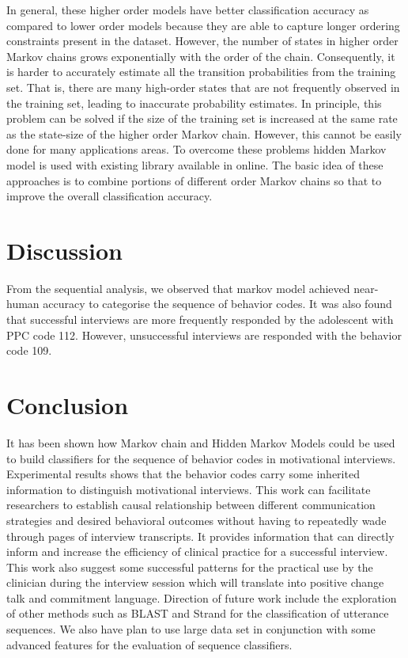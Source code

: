 \documentclass{amia}
\begin{document}
In general, these higher order models have better classification accuracy as compared to lower order models because they are able to capture longer ordering constraints present in the dataset. However, the number of states in higher order Markov chains grows exponentially with the order of the chain. Consequently, it is harder to accurately estimate all the transition probabilities from the training set. That is, there are many high-order states that are not frequently observed in the training set, leading to inaccurate probability estimates. In principle, this problem can be solved if the size of the training set is increased at the same rate as the state-size of the higher order Markov chain. However, this cannot be easily done for many applications areas. To overcome these problems hidden Markov model is used with existing library available in online. The basic idea of these approaches is to combine portions of different order Markov chains so that to improve the overall classification accuracy.

\section*{Discussion}
From the sequential analysis, we observed that markov model achieved near-human accuracy to categorise the sequence of behavior codes. It was also found that successful interviews are more frequently responded by the adolescent with PPC code 112. However, unsuccessful interviews are responded with the behavior code 109.

\section*{Conclusion}
It has been shown how Markov chain and Hidden Markov Models could be used to build classifiers for the sequence of behavior codes in motivational interviews. Experimental results shows that the behavior codes carry some inherited information to distinguish motivational interviews. This work can facilitate researchers to establish causal relationship between different communication strategies and desired behavioral outcomes without having to repeatedly wade through pages of interview transcripts. It provides information that can directly inform and increase the efficiency of clinical practice for a successful interview. This work also suggest some successful patterns for the practical use by the clinician during the interview session which will translate into positive change talk and commitment language. Direction of future work include the exploration of other methods such as BLAST \cite{altschul1990basic} and Strand \cite{drew2014strand} for the classification of utterance sequences. We also have plan to use large data set in conjunction with some advanced features for the evaluation of sequence classifiers. 
\end{document}
